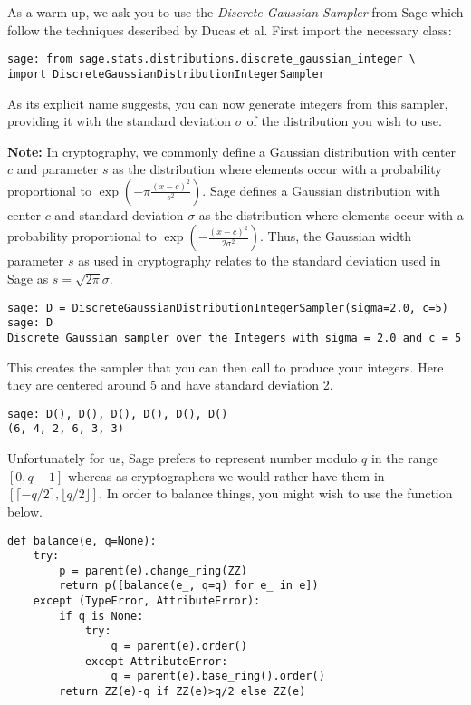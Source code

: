 \documentclass[10pt,a4paper,nobib]{tufte-handout}
\begin{document}
As a warm up, we ask you to use the \textit{Discrete Gaussian Sampler} from Sage which follow the techniques described by Ducas et al. First import the necessary class:

\lstset{language=sage,label= ,caption= ,captionpos=b,numbers=none}
\begin{lstlisting}
sage: from sage.stats.distributions.discrete_gaussian_integer \
import DiscreteGaussianDistributionIntegerSampler
\end{lstlisting}

As its explicit name suggests, you can now generate integers from this sampler, providing it with the standard deviation $\sigma$ of the distribution you wish to use.

\textbf{Note:} In cryptography, we commonly define a Gaussian distribution with center $c$ and parameter $s$ as the distribution where elements occur with a probability proportional to $\exp(-\pi\frac{{(x-c)}^2}{s^2})$. Sage defines a Gaussian distribution with center \(c\) and standard deviation \(\sigma\) as the distribution where elements occur with a probability proportional to $\exp(-\frac{{(x-c)}^2}{2\sigma^2})$. Thus, the Gaussian width parameter \(s\) as used in cryptography relates to the standard deviation used in Sage as \(s = \sqrt{2\pi}\sigma\).

\lstset{language=sage,label= ,caption= ,captionpos=b,numbers=none}
\begin{lstlisting}
sage: D = DiscreteGaussianDistributionIntegerSampler(sigma=2.0, c=5)
sage: D
Discrete Gaussian sampler over the Integers with sigma = 2.0 and c = 5
\end{lstlisting}

This creates the sampler that you can then call to produce your integers. Here they are centered around 5 and have standard deviation 2.

\lstset{language=sage,label= ,caption= ,captionpos=b,numbers=none}
\begin{lstlisting}
sage: D(), D(), D(), D(), D(), D()
(6, 4, 2, 6, 3, 3)
\end{lstlisting}


Unfortunately for us, Sage prefers to represent number modulo $q$ in the range $[0, q-1]$ whereas as cryptographers we would rather have them in $[\lceil-q/2\rceil, \lfloor q/2\rfloor]$. In order to balance things, you might wish to use the function below.

\lstset{language=sage,label= ,caption= ,captionpos=b,numbers=none}
\begin{lstlisting}
def balance(e, q=None):
    try:
        p = parent(e).change_ring(ZZ)
        return p([balance(e_, q=q) for e_ in e])
    except (TypeError, AttributeError):
        if q is None:
            try:
                q = parent(e).order()
            except AttributeError:
                q = parent(e).base_ring().order()
        return ZZ(e)-q if ZZ(e)>q/2 else ZZ(e)
\end{lstlisting}
\end{document}
